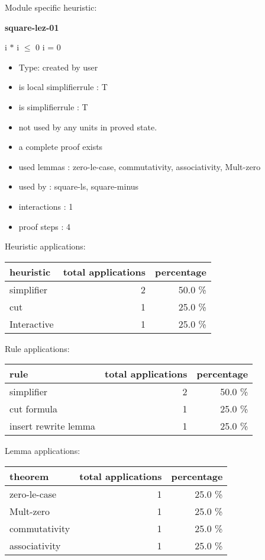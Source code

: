 \documentclass[a4paper]{article}
\begin{document}
Module specific heuristic:

\pagebreak

{\LARGE\bf square-lez-01}\label{lemma-square-lez-01}

\medskip

 \Fol i $*$ i $\le$ 0 \Equiv i = 0

\begin{itemize}

\item Type: created by user

\item is local simplifierrule : T
\item is simplifierrule : T
\item not used by any units in proved state.
\item       a complete proof exists
\item       used lemmas  : zero-le-case, commutativity, associativity, Mult-zero
\item       used by      : square-ls, square-minus
\item       interactions : 1
\item       proof steps  : 4
\end{itemize}

\medskip


Heuristic applications:

\begin{supertabular}{l|r|r}
heuristic	& total applications & percentage \\ \hline
simplifier & 2 & 50.0 \% \\
cut & 1 & 25.0 \% \\
Interactive & 1 & 25.0 \% \\

\end{supertabular}

Rule applications:

\begin{supertabular}{l|r|r}
rule	        & total applications & percentage \\ \hline
simplifier & 2 & 50.0 \% \\
cut formula & 1 & 25.0 \% \\
insert rewrite lemma & 1 & 25.0 \% \\

\end{supertabular}

Lemma applications:

\begin{supertabular}{l|r|r}
theorem	        & total applications & percentage \\ \hline
zero-le-case & 1 & 25.0 \% \\
Mult-zero & 1 & 25.0 \% \\
commutativity & 1 & 25.0 \% \\
associativity & 1 & 25.0 \% \\

\end{supertabular}
\end{document}
